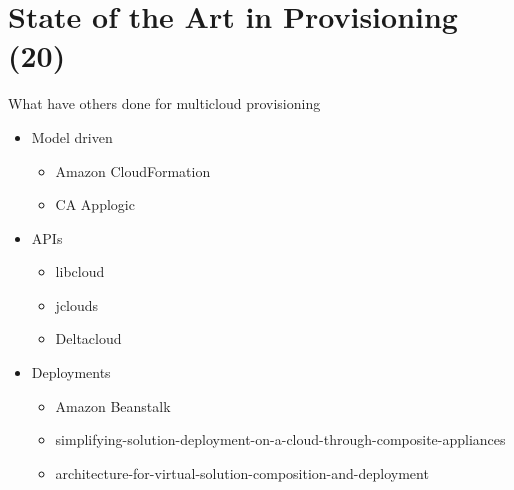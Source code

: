 \section{State of the Art in Provisioning (20)}

What have others done for multicloud provisioning

\begin{itemize}
  \item Model driven
    \begin{itemize}
      \item Amazon CloudFormation
      \item CA Applogic
    \end{itemize}
  \item APIs
    \begin{itemize}
      \item libcloud
      \item jclouds
      \item Deltacloud
    \end{itemize}
  \item Deployments
    \begin{itemize}
      \item Amazon Beanstalk
      \item simplifying-solution-deployment-on-a-cloud-through-composite-appliances
      \item architecture-for-virtual-solution-composition-and-deployment
    \end{itemize}
\end{itemize}
